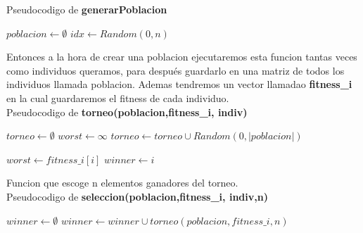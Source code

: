 \newpage
Pseudocodigo de \textbf{generarPoblacion}
\begin{algorithm}[H]
  \begin{algorithmic}[1]
      \State $poblacion \gets \emptyset $
       
        \State $idx \gets Random(0,n)$ 
        \EndIf
      \EndWhile
      \State {}
    \EndFunction
  \end{algorithmic}
\end{algorithm}

Entonces a la hora de crear una poblacion ejecutaremos esta funcion tantas veces como individuos queramos, para después
guardarlo en una matriz de todos los individuos llamada poblacion.
Ademas tendremos un vector llamadao \textbf{fitness\_i} en la cual guardaremos el fitness de cada individuo.\\

Pseudocodigo de \textbf{torneo(poblacion,fitness\_i, indiv)}
\begin{algorithm}[H]
  \begin{algorithmic}[1]
      \State $torneo \gets \emptyset $
      \State $worst \gets \infty$
       
        \State $torneo \gets torneo \cup Random(0,|poblacion|)$ 

      \EndWhile
          \State $worst \gets fitness\_i[i] $
          \State $winner \gets i$
        \EndIf
      \EndFor
      \State {}
    \EndFunction
  \end{algorithmic}
\end{algorithm}
\newpage
Funcion que escoge n elementos ganadores del torneo.\\
Pseudocodigo de \textbf{seleccion(poblacion,fitness\_i, indiv,n)}
\begin{algorithm}[H]
  \begin{algorithmic}[1]
      \State $winner \gets \emptyset $
          \State $winner \gets winner \cup torneo(poblacion,fitness\_i,n)$
      \EndFor
      \State {}
    \EndFunction
  \end{algorithmic}
\end{algorithm}



